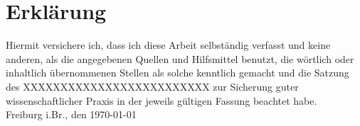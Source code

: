 \documentclass[12pt,a4paper]{scrartcl}
\numberwithin{equation}{section}
\begin{document}
%
\newpage
\thispagestyle{empty}
\vspace*{8cm}
\section*{Erklärung}

Hiermit versichere ich, dass ich diese Arbeit selbständig verfasst und keine anderen, als die angegebenen Quellen und Hilfsmittel benutzt, die wörtlich oder inhaltlich übernommenen Stellen als solche kenntlich gemacht und die Satzung des XXXXXXXXXXXXXXXXXXXXXXXXX zur Sicherung guter wissenschaftlicher Praxis in der jeweils gültigen Fassung beachtet habe. \\[2ex] 
\noindent
Freiburg i.Br., den \today\\[5ex]
\end{document}
